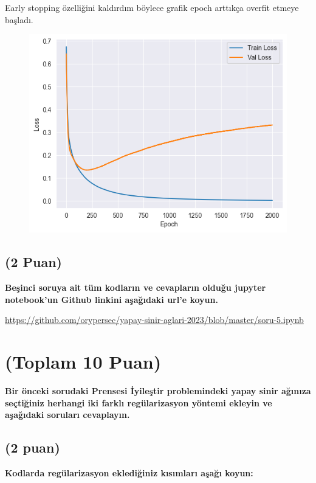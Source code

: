 \documentclass[11pt]{article}
\begin{document}
Early stopping özelliğini kaldırdım böylece grafik epoch arttıkça overfit etmeye başladı.

\begin{figure}[ht!]
    \centering
    \includegraphics{worst.png}
    \caption{}
    \label{fig:my_psic}
\end{figure}
    

\subsection{(2 Puan)} \textbf{Beşinci soruya ait tüm kodların ve cevapların olduğu jupyter notebook'un Github linkini aşağıdaki url'e koyun.}

\url{https://github.com/orypersec/yapay-sinir-aglari-2023/blob/master/soru-5.ipynb}

\section{(Toplam 10 Puan)} \textbf{Bir önceki sorudaki Prensesi İyileştir problemindeki yapay sinir ağınıza seçtiğiniz herhangi iki farklı regülarizasyon yöntemi ekleyin ve aşağıdaki soruları cevaplayın.} 

\subsection{(2 puan)} \textbf{Kodlarda regülarizasyon eklediğiniz kısımları aşağı koyun:} 
\end{document}
